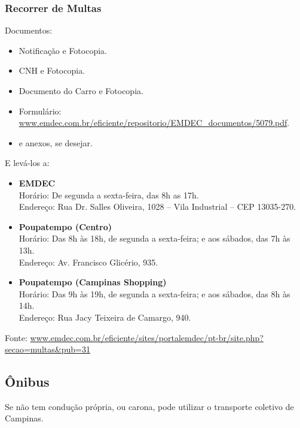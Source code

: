 \subsubsection{Recorrer de Multas}

Documentos:
\begin{itemize}
\item  Notificação e Fotocopia.
\item  CNH e Fotocopia.
\item  Documento do Carro e Fotocopia.
\item  Formulário: \url{www.emdec.com.br/eficiente/repositorio/EMDEC_documentos/5079.pdf}.
\item  e anexos, se desejar.
\end{itemize}

E levá-los a:
\begin{itemize}
\item   \textbf{EMDEC}
		\\Horário: De segunda a sexta-feira, das 8h as 17h.
		\\Endereço: Rua Dr. Salles Oliveira, 1028 -- Vila Industrial -- CEP 13035-270.
\item   \textbf{Poupatempo (Centro)}
		\\Horário: Das 8h às 18h, de segunda a sexta-feira; e aos sábados, das 7h às 13h.
		\\Endereço: Av. Francisco Glicério, 935.
\item   \textbf{Poupatempo (Campinas Shopping)}
		\\Horário: Das 9h às 19h, de segunda a sexta-feira; e aos sábados, das 8h às 14h.
		\\Endereço: Rua Jacy Teixeira de Camargo, 940.
\end{itemize}

Fonte: \url{www.emdec.com.br/eficiente/sites/portalemdec/pt-br/site.php?secao=multas&pub=31}

\subsection{Ônibus}

Se não tem condução própria, ou carona, pode utilizar o transporte coletivo de
Campinas.

